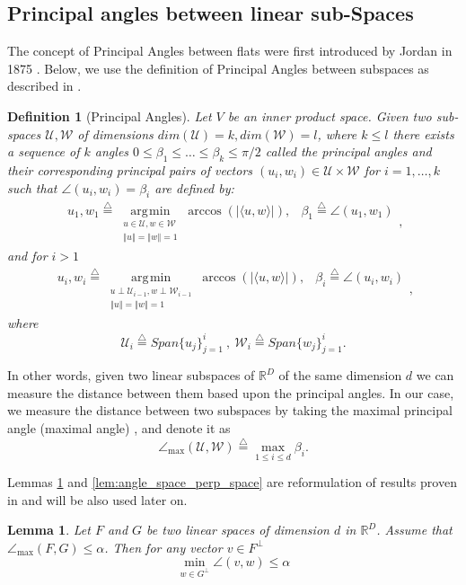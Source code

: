\documentclass[12pt]{article}
\newtheorem{definition}{Definition}
\newtheorem{Lemma}[Theorem]{Lemma}
\theoremstyle{remark}
\newcommand{\RR}{\mathbb{R}}
\newcommand{\UU}{\mathcal{U}}
\newcommand{\WW}{\mathcal{W}}
\newcommand{\defeq}{\stackrel{\bigtriangleup}{=}}
\newcommand{\abs}[1]{\left\vert #1 \right\vert}
\newcommand{\norm}[1]{\left\Vert #1 \right\Vert}
\newcommand{\maxangle}{\angle_{\max}}
\DeclareMathOperator*{\argmin}{\arg\!\min}
\begin{document}
\begin{appendices}
\subsection{Principal angles between linear sub-Spaces}
The concept of Principal Angles between flats were first introduced by Jordan in 1875 \cite{jordan1875essai}.
Below, we use the definition of Principal Angles between subspaces as described in \cite{bjorck1973numerical}.
\begin{definition}[Principal Angles]\label{def:principal_angles_clean}
	Let $V$ be an inner product space. Given two sub-spaces $\UU, \WW$ of dimensions $dim(\UU)=k, dim(\WW) = l$, where $k \leq l$ there exists a sequence of $k$ angles $0 \leq \beta_1 \leq \ldots \leq \beta_k \leq \pi/2$ called the principal angles and their corresponding principal pairs of vectors $(u_i, w_i)\in\UU\times\WW$ for $i=1,\ldots,k$ such that $\angle(u_i,w_i) = \beta_i$ are defined by: 
	\begin{equation*}
	\begin{array}{ll}
	    u_1, w_1 \defeq \argmin\limits_{\substack{u\in\UU, w\in\WW \\ \norm{u}=\norm{w} =1}}\arccos\left(\abs{\langle u, w \rangle}\right), &
	    \beta_1 \defeq \angle(u_1, w_1)
	\end{array}    
	,\end{equation*}
	and for $i > 1$
	\begin{equation*}
	\begin{array}{ll}
	    u_i, w_i \defeq \argmin\limits_{\substack{u\perp\UU_{i-1}, w\perp\WW_{i-1} \\ \norm{u}=\norm{w} =1}}\arccos\left(\abs{\langle u, w \rangle}\right), &
	    \beta_i \defeq \angle(u_i, w_i)
	\end{array}
	,\end{equation*}
    where $$\UU_i \defeq Span\{u_j\}_{j=1}^i ~,~ \WW_i \defeq Span\{w_j\}_{j=1}^i.$$
\end{definition}
In other words, given two linear subspaces of $\RR^D$ of the same dimension $d$ we can measure the distance between them based upon the principal angles. 
In our case, we measure the distance between two subspaces by taking the maximal principal angle (maximal angle) , and denote it as
\begin{equation}\label{eq:TheAngleLinear_clean}
    \angle_{\max}(\UU,\WW) \defeq \max_{1\leq i\leq d}\beta_i
.\end{equation}

Lemmas \ref{lem:angle_space_to_vec} and \ref{lem:angle_space_perp_space} are reformulation of results proven in \cite{knyazev2007majorization} and will be also used later on.
\begin{Lemma}\label{lem:angle_space_to_vec}
Let $F$ and $G$ be two linear spaces of dimension $d$ in $\RR^D$. Assume that $\maxangle(F,G)\leq \alpha$. Then for any vector $v \in F^\perp$
\[
\min\limits_{w\in G^\perp} \angle(v,w) \leq \alpha
\]
\end{Lemma}


\end{appendices}
\end{document}
